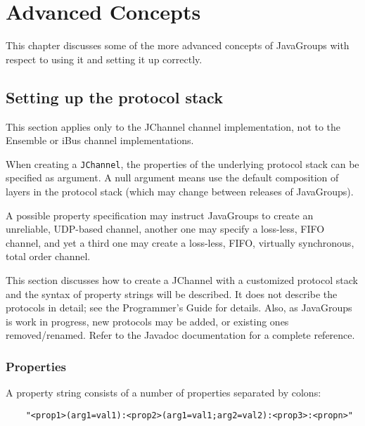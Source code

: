 
\chapter{Advanced Concepts} \label{Advanced}

This chapter discusses some of the more advanced concepts of JavaGroups with respect
to using it and setting it up correctly.



  \section{Setting up the protocol stack}

  This section applies only to the JChannel channel implementation, not to the
  Ensemble or iBus channel implementations.

  When creating a {\tt JChannel}, the properties of the underlying protocol stack can
  be specified as argument. A null argument means use the default composition of
  layers in the protocol stack (which may change between releases of JavaGroups).

  A possible property specification may instruct JavaGroups to create an unreliable,
  UDP-based channel, another one may specify a loss-less, FIFO channel, and yet a
  third one may create a loss-less, FIFO, virtually synchronous, total order channel.

  This section discusses how to create a JChannel with a customized protocol stack
  and the syntax of property strings will be described. It does not describe the
  protocols in detail; see the Programmer's Guide for details. Also, as JavaGroups is
  work in progress, new protocols may be added, or existing ones
  removed/renamed. Refer to the Javadoc documentation for a complete reference.

      
    \subsection{Properties} \label{Properties}

    A property string consists of a number of properties separated by colons:

    \begin{small}
    \begin{verbatim}
    "<prop1>(arg1=val1):<prop2>(arg1=val1;arg2=val2):<prop3>:<propn>"
    \end{verbatim}
    \end{small}

